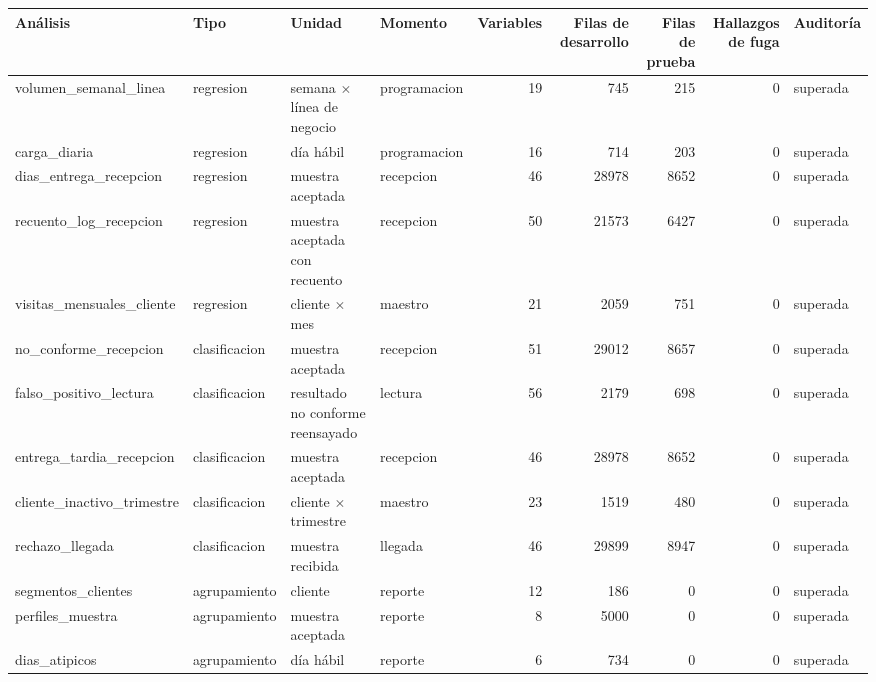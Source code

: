 \begin{tabular}{llllrrrrl}
\toprule
Análisis & Tipo & Unidad & Momento & Variables & Filas de desarrollo & Filas de prueba & Hallazgos de fuga & Auditoría \\
\midrule
volumen\_semanal\_linea & regresion & semana $\times$ línea de negocio & programacion & 19 & 745 & 215 & 0 & superada \\
carga\_diaria & regresion & día hábil & programacion & 16 & 714 & 203 & 0 & superada \\
dias\_entrega\_recepcion & regresion & muestra aceptada & recepcion & 46 & 28978 & 8652 & 0 & superada \\
recuento\_log\_recepcion & regresion & muestra aceptada con recuento & recepcion & 50 & 21573 & 6427 & 0 & superada \\
visitas\_mensuales\_cliente & regresion & cliente $\times$ mes & maestro & 21 & 2059 & 751 & 0 & superada \\
no\_conforme\_recepcion & clasificacion & muestra aceptada & recepcion & 51 & 29012 & 8657 & 0 & superada \\
falso\_positivo\_lectura & clasificacion & resultado no conforme reensayado & lectura & 56 & 2179 & 698 & 0 & superada \\
entrega\_tardia\_recepcion & clasificacion & muestra aceptada & recepcion & 46 & 28978 & 8652 & 0 & superada \\
cliente\_inactivo\_trimestre & clasificacion & cliente $\times$ trimestre & maestro & 23 & 1519 & 480 & 0 & superada \\
rechazo\_llegada & clasificacion & muestra recibida & llegada & 46 & 29899 & 8947 & 0 & superada \\
segmentos\_clientes & agrupamiento & cliente & reporte & 12 & 186 & 0 & 0 & superada \\
perfiles\_muestra & agrupamiento & muestra aceptada & reporte & 8 & 5000 & 0 & 0 & superada \\
dias\_atipicos & agrupamiento & día hábil & reporte & 6 & 734 & 0 & 0 & superada \\
\bottomrule
\end{tabular}

